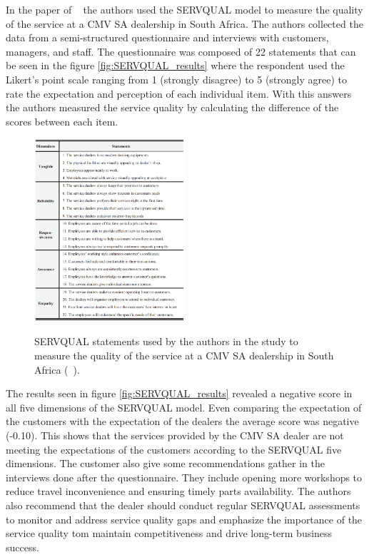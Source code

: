 In the paper of ~\cite{Measuring_After_sales_Service_Quality} the authors used the SERVQUAL model to measure the quality of the service at a CMV SA dealership in South Africa.
The authors collected the data from a semi-structured questionnaire and interviews with customers, managers, and staff.
The questionnaire was composed of 22 statements that can be seen in the figure \ref{fig:SERVQUAL_results} where the respondent used the Likert's point scale ranging from 1 (strongly disagree) to 5 (strongly agree) to rate the expectation and perception of each individual item.
With this answers the authors measured the service quality by calculating the difference of the scores between each item.
 
\begin{figure}[h]
  \caption{SERVQUAL statements used by the authors in the study to measure the quality of the service at a CMV SA dealership in South Africa (~\cite{Measuring_After_sales_Service_Quality}).}
  \centering
  \includegraphics[width=0.50\textwidth]{figs/SERVQUAL_statements}
  \label{fig:SERVQUAL_statements}
\end{figure}


The results seen in figure \ref{fig:SERVQUAL_results} revealed a negative score in all five dimensions of the SERVQUAL model. 
Even comparing the expectation of the customers with the expectation of the dealers the average score was negative (-0.10).
This shows that the services provided by the CMV SA dealer are not meeting the expectations of the customers according to the SERVQUAL five dimensions.
The customer also give some recommendations gather in the interviews done after the questionnaire. 
They include opening more workshops to reduce travel inconvenience and ensuring timely parts availability.
The authors also recommend that the dealer should conduct regular SERVQUAL assessments to monitor and address service quality gaps and emphasize the importance of the service quality tom maintain competitiveness and drive long-term business success. ~\cite{Measuring_After_sales_Service_Quality}



